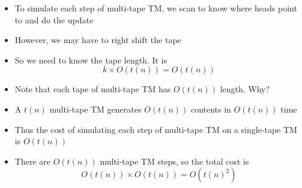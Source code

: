 \begin{frame}[allowframebreaks]
\begin{itemize}
\begin{center}
\end{center}


\item To simulate each step of multi-tape TM, we scan to know where heads point to
  and do the update
\item However, we may have to
right shift the tape 
\item So we need to know the tape length. It is
\begin{equation*}
  k \times O(t(n)) = O(t(n)) 
\end{equation*}
  
\item Note that each tape of multi-tape TM has $O(t(n))$ length. Why?

\item A $t(n)$ multi-tape TM generates
$O(t(n))$ contents in 
$O(t(n))$ time

\item Thus the cost of
  simulating each step of multi-tape TM on a single-tape TM is
  $O(t(n))$
\item There are $O(t(n))$ multi-tape TM steps, so
  the total cost is
  \begin{equation*}
    O(t(n)) \times O(t(n)) = O(t(n)^2)
\end{equation*}
\end{itemize}\end{frame}


